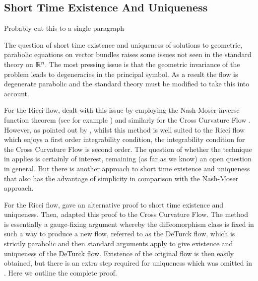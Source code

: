 \documentclass[a4paper, 12pt]{amsart}
\begin{document}
\subsection{Short Time Existence And Uniqueness}
\label{subsec:xcf_existence_uniqueness}

{\color{red} Probably cut this to a single paragraph}

The question of short time existence and uniqueness of solutions to geometric, parabolic equations on vector bundles raises some issues not seen in the standard theory on \(\mathbb{R}^n\). The most pressing issue is that the geometric invariance of the problem leads to degeneracies in the principal symbol. As a result the flow is degenerate parabolic and the standard theory must be modified to take this into account.

For the Ricci flow, \cite{Hamilton:/1982} dealt with this issue by employing the Nash-Moser inverse function theorem (see for example \cite{MR656198}) and similarly for the Cross Curvature Flow \cite{MR2055396}. However, as pointed out by \cite{MR2207496}, whilst this method is well suited to the Ricci flow which enjoys a first order integrability condition, the integrability condition for the Cross Curvature Flow is second order. The question of whether the technique in \cite{Hamilton:/1982} applies is certainly of interest, remaining (as far as we know) an open question in general. But there is another approach to short time existence and uniqueness that also has the advantage of simplicity in comparison with the Nash-Moser approach.

For the Ricci flow, \cite{MR697987} gave an alternative proof to short time existence and uniqueness. Then, \cite{MR2207496} adapted this proof to the Cross Curvature Flow. The method is essentially a gauge-fixing argument whereby the diffeomorphism class is fixed in such a way to produce a new flow, referred to as the DeTurck flow, which is strictly parabolic and then standard arguments apply to give existence and uniqueness of the DeTurck flow. Existence of the original flow is then easily obtained, but there is an extra step required for uniqueness which was omitted in \cite{MR2207496}. Here we outline the complete proof.
\end{document}
